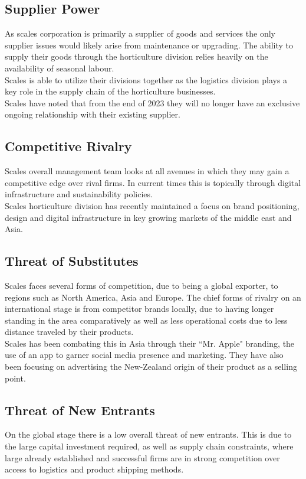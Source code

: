 \documentclass{article}
\begin{document}
\subsection{Supplier Power}
As scales corporation is primarily a supplier of goods and services the only supplier issues would likely arise from maintenance or upgrading.
The ability to supply their goods through the horticulture division relies heavily on the availability of seasonal labour.\\

Scales is able to utilize their divisions together as the logistics division plays a key role in the supply chain of the horticulture businesses.\\

Scales have noted that from the end of 2023 they will no longer have an exclusive ongoing relationship with their existing supplier.

\subsection{Competitive Rivalry}
Scales overall management team looks at all avenues in which they may gain a competitive edge over rival firms. In current times this is topically through digital infrastructure and sustainability policies.\\

Scales horticulture division has recently maintained a focus on brand positioning, design and digital infrastructure in key growing markets of the middle east and Asia. 

\subsection{Threat of Substitutes}
Scales faces several forms of competition, due to being a global exporter, to regions such as North America, Asia and Europe. The chief forms of rivalry on an international stage is from competitor brands locally, due to having longer standing in the area comparatively as well as less operational costs due to less distance traveled by their products.\\

Scales has been combating this in Asia through their ``Mr. Apple" branding, the use of an app to garner social media presence and marketing. They have also been focusing on advertising the New-Zealand origin of their product as a selling point.

\subsection{Threat of New Entrants }
On the global stage there is a low overall threat of new entrants. This is due to the large capital investment required, as well as supply chain constraints, where large already established and successful firms are in strong competition over access to logistics and product shipping methods.\\
\end{document}
